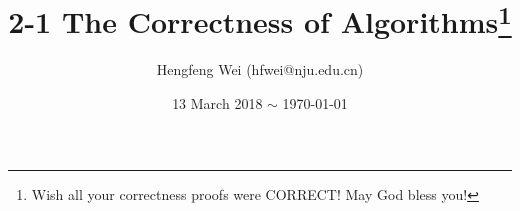 \documentclass{tufte-handout}
\title{2-1 The Correctness of Algorithms\thanks{Wish all your correctness proofs were \uppercase{correct}! May God bless you!}}
\author[hengxin]{Hengfeng Wei {\normalsize (hfwei@nju.edu.cn)}}
\date{13 March 2018 $\sim$ \today{}}
\begin{document}
\begin{CJK*}{UTF8}{gbsn}

\maketitle








\end{CJK*}
\end{document}
